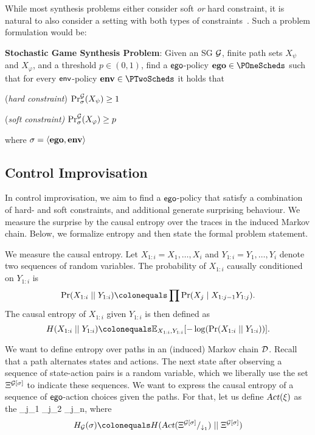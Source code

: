 {{While most synthesis problems either consider soft \emph{or} hard constraint, it is natural to also consider a setting with both types of constraints~\cite{}. Such a problem formulation would be:
\begin{mdframed}{}
\textbf{Stochastic Game Synthesis Problem}:
Given an SG $\mathcal{G}$, finite path sets $X_\psi$ and $X_\varphi$, and a threshold $p \in (0,1)$,  find a $\mathsf{ego}$-policy $\pOneSched \in \POneScheds$  such that for every $\mathsf{env}$-policy $\pTwoSched \in \PTwoScheds$ it holds that 
\begin{compactenum}
	\item (\emph{hard constraint}) $\Pr^{\mathcal{G}}_{\sigma}(X_\psi) \geq 1$
	\item (\emph{soft constraint)} $\Pr^{\mathcal{G}}_{\sigma}(X_\varphi) \geq p$
\end{compactenum}
 where $\sigma = \langle \mathbf{ego}, \mathbf{env} \rangle$
\end{mdframed}




\subsection{Control Improvisation}
In control improvisation, we aim to find a $\mathsf{ego}$-policy that satisfy a combination of hard- and soft constraints, and additional generate surprising behaviour. We measure the surprise by the causal entropy over the traces in the induced Markov chain. Below, we formalize entropy and then state the formal problem statement. 

We measure the causal entropy. Let $X_{1:i} = X_1, \hdots, X_i$ and $Y_{1:i} = Y_1,\hdots,Y_i$ denote two sequences of random variables. The probability of $ X_{1:i}$ causally conditioned on $Y_{1:i}$ is 
\[ \causalprob{X_{1:i}}{Y_{1:i}} \colonequals \prod \Pr(X_j \mid X_{1:j-1}Y_{1:j}). \]
The causal entropy of $X_{1:i}$ given $Y_{1:i}$ is then defined as 
\[  H(X_{1:i}\mid\mid Y_{1:i}) \colonequals \expOver{X_{1:i},Y_{1:i}}{-\log(\causalprob{X_{1:i}}{Y_{1:i}})}.\] 

We want to define entropy over paths in an (induced) Markov chain $\mathcal{D}$. Recall that a path alternates states and actions. The next state after observing a sequence of state-action pairs is a random variable, which we liberally use the set $\Xi^{\mathcal{G}[\sigma]}_{}$ to indicate these sequences.  We want to express the causal entropy of a sequence of $\mathsf{ego}$-action choices given the paths. For that, let us define $\textsl{Act}(\xi)$ as the \act_{j_1} \act_{j_2} \hdots \act_{j_n}, where 
\[ H_\sg(\sigma) \colonequals H( \textsl{Act}(\POnePaths{\sg[\sched]})   \mid\mid \Paths{\sg[\sched]} )  \]


}}

